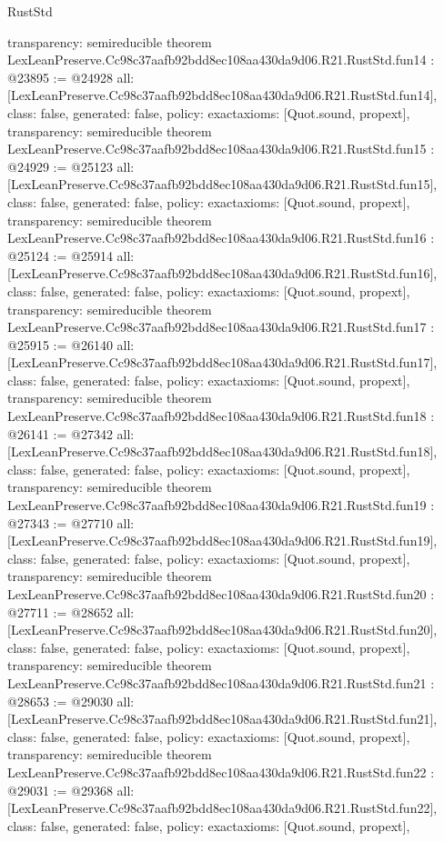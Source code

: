 \begin{lexlean}{RustStd}
\begin{coremodule}
{  transparency: semireducible
}
theorem LexLeanPreserve.Cc98c37aafb92bdd8ec108aa430da9d06.R21.RustStd.fun14 : @23895 := @24928 {
  all: [LexLeanPreserve.Cc98c37aafb92bdd8ec108aa430da9d06.R21.RustStd.fun14],
  class: false,
  generated: false,
  policy: exact{axioms: [Quot.sound, propext]},
  transparency: semireducible
}
theorem LexLeanPreserve.Cc98c37aafb92bdd8ec108aa430da9d06.R21.RustStd.fun15 : @24929 := @25123 {
  all: [LexLeanPreserve.Cc98c37aafb92bdd8ec108aa430da9d06.R21.RustStd.fun15],
  class: false,
  generated: false,
  policy: exact{axioms: [Quot.sound, propext]},
  transparency: semireducible
}
theorem LexLeanPreserve.Cc98c37aafb92bdd8ec108aa430da9d06.R21.RustStd.fun16 : @25124 := @25914 {
  all: [LexLeanPreserve.Cc98c37aafb92bdd8ec108aa430da9d06.R21.RustStd.fun16],
  class: false,
  generated: false,
  policy: exact{axioms: [Quot.sound, propext]},
  transparency: semireducible
}
theorem LexLeanPreserve.Cc98c37aafb92bdd8ec108aa430da9d06.R21.RustStd.fun17 : @25915 := @26140 {
  all: [LexLeanPreserve.Cc98c37aafb92bdd8ec108aa430da9d06.R21.RustStd.fun17],
  class: false,
  generated: false,
  policy: exact{axioms: [Quot.sound, propext]},
  transparency: semireducible
}
theorem LexLeanPreserve.Cc98c37aafb92bdd8ec108aa430da9d06.R21.RustStd.fun18 : @26141 := @27342 {
  all: [LexLeanPreserve.Cc98c37aafb92bdd8ec108aa430da9d06.R21.RustStd.fun18],
  class: false,
  generated: false,
  policy: exact{axioms: [Quot.sound, propext]},
  transparency: semireducible
}
theorem LexLeanPreserve.Cc98c37aafb92bdd8ec108aa430da9d06.R21.RustStd.fun19 : @27343 := @27710 {
  all: [LexLeanPreserve.Cc98c37aafb92bdd8ec108aa430da9d06.R21.RustStd.fun19],
  class: false,
  generated: false,
  policy: exact{axioms: [Quot.sound, propext]},
  transparency: semireducible
}
theorem LexLeanPreserve.Cc98c37aafb92bdd8ec108aa430da9d06.R21.RustStd.fun20 : @27711 := @28652 {
  all: [LexLeanPreserve.Cc98c37aafb92bdd8ec108aa430da9d06.R21.RustStd.fun20],
  class: false,
  generated: false,
  policy: exact{axioms: [Quot.sound, propext]},
  transparency: semireducible
}
theorem LexLeanPreserve.Cc98c37aafb92bdd8ec108aa430da9d06.R21.RustStd.fun21 : @28653 := @29030 {
  all: [LexLeanPreserve.Cc98c37aafb92bdd8ec108aa430da9d06.R21.RustStd.fun21],
  class: false,
  generated: false,
  policy: exact{axioms: [Quot.sound, propext]},
  transparency: semireducible
}
theorem LexLeanPreserve.Cc98c37aafb92bdd8ec108aa430da9d06.R21.RustStd.fun22 : @29031 := @29368 {
  all: [LexLeanPreserve.Cc98c37aafb92bdd8ec108aa430da9d06.R21.RustStd.fun22],
  class: false,
  generated: false,
  policy: exact{axioms: [Quot.sound, propext]},
}
\end{coremodule}
\end{lexlean}

